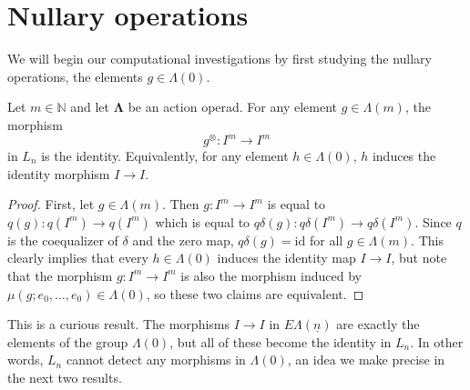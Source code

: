\documentclass{amsbook} %
\newcommand{\id}{\textrm{id}}
\newcommand{\ML}{\mathbf{\Lambda}}
\newcommand{\ELn}{E\Lambda(\underline{n})}
\numberwithin{section}{chapter}
\begin{document}
\section{Nullary operations}
We will begin our computational investigations by first studying the nullary operations, the elements $g \in \Lambda(0)$.

\begin{lem} \label{noscalar} Let $m \in \mathbb{N}$ and let $\ML$ be an action operad. For any element $g \in \Lambda(m)$, the morphism
  \[
    g^{\otimes} \colon  I^m \rightarrow I^m
  \]
in $L_n$ is the identity.
Equivalently, for any element $h \in \Lambda(0)$, $h$ induces the identity morphism $I \rightarrow I$.
\end{lem}
\begin{proof}
First, let $g \in \Lambda(m)$. Then $g \colon  I^m \rightarrow I^m$ is equal to $q(g) \colon q(I^m) \rightarrow q(I^m)$ which is equal to $q\delta(g) \colon  q\delta(I^m) \rightarrow q\delta(I^m)$. Since $q$ is the coequalizer of $\delta$ and the zero map, $q\delta(g) = \id$ for all $g \in \Lambda(m)$. This clearly implies that every $h \in \Lambda(0)$ induces the identity map $I \rightarrow I$, but note that the morphism $g \colon I^m \rightarrow I^m$ is also the morphism induced by $\mu(g; e_0, \ldots, e_0) \in \Lambda(0)$, so these two claims are equivalent.
\end{proof}

This is a curious result. The morphisms $I \rightarrow I$ in $\ELn$ are exactly the elements of the group $\Lambda(0)$, but all of these become the identity in $L_n$. In other words, $L_n$ cannot detect any morphisms in $\Lambda(0)$, an idea we make precise in the next two results. 
\end{document}
